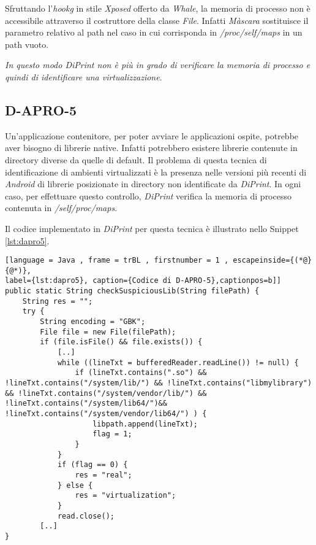 Sfruttando l'\emph{\gls{hookg}} in stile \emph{Xposed} offerto da \emph{Whale}, la memoria di processo non è accessibile attraverso il costruttore della classe \emph{File}.
Infatti \emph{Màscara} sostituisce il parametro relativo al path nel caso in cui corrisponda in \emph{/proc/self/maps} in un path vuoto.

\emph{In questo modo DiPrint non è più in grado di verificare la memoria di processo e quindi di identificare una virtualizzazione}.

\subsection*{D-APRO-5}
\label{d-apro-5}

Un'applicazione contenitore, per poter avviare le applicazioni ospite, potrebbe aver bisogno di librerie native. Infatti potrebbero esistere librerie contenute in directory diverse da quelle di default. Il problema di questa tecnica di identificazione di ambienti virtualizzati è la presenza nelle versioni più recenti di \emph{Android} di librerie posizionate in directory non identificate da \emph{DiPrint}.
In ogni caso, per effettuare questo controllo, \emph{DiPrint} verifica la memoria di processo contenuta in \emph{/self/proc/maps}.

Il codice implementato in \emph{DiPrint} per questa tecnica è illustrato nello Snippet \ref{lst:dapro5}. 

\begin{lstlisting}[language = Java , frame = trBL , firstnumber = 1 , escapeinside={(*@}{@*)},
label={lst:dapro5}, caption={Codice di D-APRO-5},captionpos=b]]
public static String checkSuspiciousLib(String filePath) {
    String res = "";
    try {
        String encoding = "GBK";
        File file = new File(filePath);
        if (file.isFile() && file.exists()) {
            [..]
            while ((lineTxt = bufferedReader.readLine()) != null) {
                if (lineTxt.contains(".so") && !lineTxt.contains("/system/lib/") && !lineTxt.contains("libmylibrary") && !lineTxt.contains("/system/vendor/lib/") && !lineTxt.contains("/system/lib64/")&& !lineTxt.contains("/system/vendor/lib64/") ) {
                    libpath.append(lineTxt);
                    flag = 1;
                }
            }
            if (flag == 0) {
                res = "real";
            } else {
                res = "virtualization";
            }
            read.close();
        [..]
}
\end{lstlisting}


